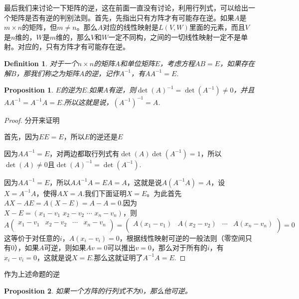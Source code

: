 \documentclass[11pt,a4paper,openany]{book}%
\theoremstyle{plain}%
\newtheorem{pro}{Proposition}[chapter]%
\newtheorem{defi}{Definition}[chapter]%
\begin{document}
最后我们来讨论一下矩阵的逆，这在前面一直没有讨论，利用行列式，可以给出一个矩阵是否有逆的判别法则。首先，先指出只有方阵才有可能存在逆。如果$A$是$m\times n$的矩阵，但$m\neq n$。那么$A$对应的线性映射是$L(V,W)$里面的元素，而且$V$是$n$维的，$W$是$m$维的，那么$V$和$W$一定不同构，之间的一切线性映射一定不是单射。对应的，只有方阵才有可能存在逆。
\begin{defi}
对于一个$n\times n$的矩阵$A$和单位矩阵$E$，考虑方程$AB=E$，如果存在解$B$，那我们称之为矩阵$A$的逆，记作$A^{-1}$，有$AA^{-1}=E$.
\end{defi}
\begin{pro}
$E$的逆为$E$.如果$A$有逆，则$\det(A)^{-1}=\det(A^{-1})\neq 0$，并且$AA^{-1}=A^{-1}A=E$.所以这就是说，$(A^{-1})^{-1}=A$.
\end{pro}
\begin{proof}分开来证明

首先，因为$EE=E$，所以$E$的逆还是$E$

因为$AA^{-1}=E$，对两边都取行列式有$\det(A)\det(A^{-1})=1$，所以$\det(A)\neq 0$且$\det(A)^{-1}=\det(A^{-1})$.

因为$AA^{-1}=E$，所以$AA^{-1}A=EA=A$，这就是说$A(A^{-1}A)=A$，设$X=A^{-1}A$，使得$AX=A$.我们下面证明$X=E$。为此首先$
AX-AE=A(X-E)=A-A=0$.因为$X-E=(x_1-v_1\,\,x_2-v_2\,\, \cdots \,\,x_n-v_n)$，则
\[
A
\begin{pmatrix}
x_1-v_1 & x_2-v_2 & \cdots & x_n-v_n\\
\end{pmatrix}
=
\begin{pmatrix}
A(x_1-v_1) & A(x_2-v_2) & \cdots & A(x_n-v_n)\\
\end{pmatrix}
=0
\]
这等价于对任意的$i$，$A(x_i-v_i)=0$，根据线性映射可逆的一般法则（零空间只有$0$），如果$A$可逆，则如果$Av=0$可以推出$v=0$，那么对于所有的$i$，有$x_i-v_i=0$，这就是说$X=E$.那么这就证明了$A^{-1}A=E$.
\end{proof}
作为上述命题的逆
\begin{pro}
如果一个方阵的行列式不为$0$，那么他可逆。
\end{pro}
\end{document}
